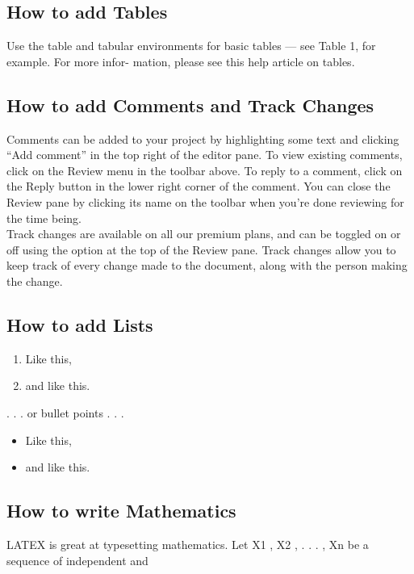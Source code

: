 \documentclass{article}
\begin{document}
	\subsection{How to add Tables}
	\begingroup
	Use the table and tabular environments for basic tables — see Table 1, for example. For more infor-
	mation, please see this help article on tables.
	
	\endgroup
	\subsection{How to add Comments and Track Changes}
	\begingroup
	Comments can be added to your project by highlighting some text and clicking “Add comment” in
	the top right of the editor pane. To view existing comments, click on the Review menu in the toolbar
	above. To reply to a comment, click on the Reply button in the lower right corner of the comment.
	You can close the Review pane by clicking its name on the toolbar when you’re done reviewing for the
	time being.\\
	\indent Track changes are available on all our premium plans, and can be toggled on or off using the option
	at the top of the Review pane. Track changes allow you to keep track of every change made to the
	document, along with the person making the change.
	
	\endgroup
	\subsection{How to add Lists}
	\begin{enumerate}
		\item Like this,
		\item and like this.
	\end{enumerate}
	. . . or bullet points . . .
	\begin{itemize}
		\item Like this,
		\item and like this.
	\end{itemize}
	\subsection{How to write Mathematics}
	\begingroup
	LATEX is great at typesetting mathematics. Let X1 , X2 , . . . , Xn be a sequence of independent and
	
	\endgroup
\end{document}
